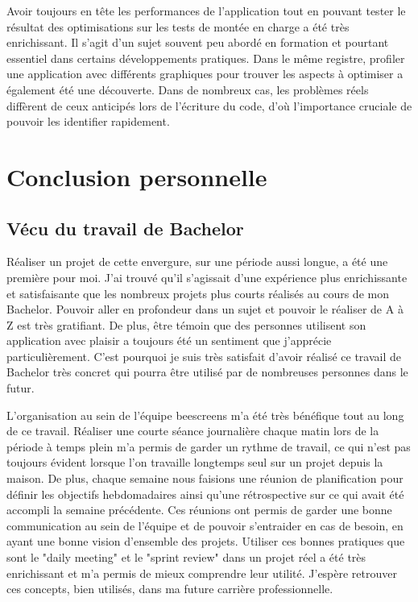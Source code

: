 Avoir toujours en tête les performances de l'application tout en pouvant tester le résultat des optimisations sur les tests de montée en charge a été très enrichissant. Il s'agit d'un sujet souvent peu abordé en formation et pourtant essentiel dans certains développements pratiques. Dans le même registre, profiler une application avec différents graphiques pour trouver les aspects à optimiser a également été une découverte. Dans de nombreux cas, les problèmes réels diffèrent de ceux anticipés lors de l'écriture du code, d'où l'importance cruciale de pouvoir les identifier rapidement.

\section{Conclusion personnelle}

\subsection{Vécu du travail de Bachelor}

Réaliser un projet de cette envergure, sur une période aussi longue, a été une première pour moi. J'ai trouvé qu'il s'agissait d'une expérience plus enrichissante et satisfaisante que les nombreux projets plus courts réalisés au cours de mon Bachelor. Pouvoir aller en profondeur dans un sujet et pouvoir le réaliser de A à Z est très gratifiant. De plus, être témoin que des personnes utilisent son application avec plaisir a toujours été un sentiment que j'apprécie particulièrement. C'est pourquoi je suis très satisfait d'avoir réalisé ce travail de Bachelor très concret qui pourra être utilisé par de nombreuses personnes dans le futur.

L'organisation au sein de l'équipe \gls{beescreens} m'a été très bénéfique tout au long de ce travail. Réaliser une courte séance journalière chaque matin lors de la période à temps plein m'a permis de garder un rythme de travail, ce qui n'est pas toujours évident lorsque l'on travaille longtemps seul sur un projet depuis la maison. De plus, chaque semaine nous faisions une réunion de planification pour définir les objectifs hebdomadaires ainsi qu'une rétrospective sur ce qui avait été accompli la semaine précédente. Ces réunions ont permis de garder une bonne communication au sein de l'équipe et de pouvoir s'entraider en cas de besoin, en ayant une bonne vision d'ensemble des projets. Utiliser ces bonnes pratiques que sont le "daily meeting" et le "sprint review" dans un projet réel a été très enrichissant et m'a permis de mieux comprendre leur utilité. J'espère retrouver ces concepts, bien utilisés, dans ma future carrière professionnelle.

